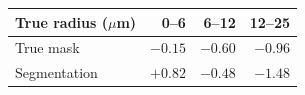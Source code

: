 \begin{tabular}{lrrr}
\toprule
True radius ($\mu$m) & 0--6 & 6--12 & 12--25 \\
\midrule
True mask & $-0.15$ & $-0.60$ & $-0.96$ \\
Segmentation & $+0.82$ & $-0.48$ & $-1.48$ \\
\bottomrule
\end{tabular}
